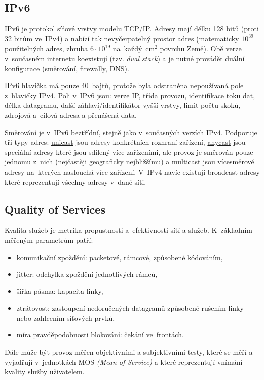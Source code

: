 \subsection{IPv6}

IPv6 je protokol síťové vrstvy modelu TCP/IP.
Adresy mají délku 128 bitů (proti 32 bitům ve~IPv4) a nabízí tak nevyčerpatelný prostor adres (matematicky $10^{39}$ použitelných adres, zhruba $6 \cdot 10^{19}$ na~každý~cm$^2$ povrchu Země).
Obě verze v~současném internetu koexistují (tzv. \emph{dual stack}) a je nutné provádět duální konfigurace (směrování, firewally, DNS).

IPv6 hlavička má pouze 40~bajtů, protože byla odstraněna nepoužívaná pole z~hlavičky IPv4.
Poli v~IPv6 jsou: verze IP, třída provozu, identifikace toku dat, délka datagramu, další záhlaví/identifikátor vyšší vrstvy, limit počtu skoků, zdrojová a~cílová adresa a přenášená data.

Směrování je v~IPv6 beztřídní, stejně jako v~současných verzích IPv4.
Podporuje tři typy adres: \underline{unicast} jsou adresy konkrétních rozhraní zařízení, \underline{anycast} jsou speciální adresy které jsou sdílený více zařízeními, ale provoz je směrován pouze jednomu z~nich (nejčastěji geograficky nejbližšímu) a \underline{multicast} jsou vícesměrové adresy na~kterých naslouchá více zařízení.
V~IPv4 navíc existují broadcast adresy které reprezentují všechny adresy v~dané síti.


\subsection{Quality of Services}

Kvalita služeb je metrika propustnosti a~efektivnosti sítí a služeb.
K~základním měřeným parametrům patří:
\begin{itemize}
\item komunikační zpoždění: packetové, rámcové, způsobené kódováním,
\item jitter: odchylka zpoždění jednotlivých rámců,
\item šířka pásma: kapacita linky,
\item ztrátovost: zastoupení nedoručených datagramů způsobené rušením linky nebo zahlcením síťových prvků,
\item míra pravděpodobnosti blokování: čekání ve~frontách.
\end{itemize}

Dále může být provoz měřen objektivními a subjektivními testy, které se měří a vyjadřují v~jednotkách MOS \emph{(Mean of Service)} a které reprezentují vnímání kvality služby uživatelem.

